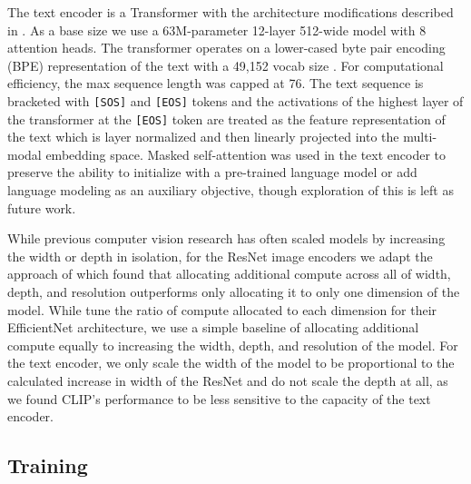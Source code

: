 The text encoder is a Transformer \citep{vaswani2017attention} with the architecture modifications described in \citet{radford2019language}. As a base size we use a 63M-parameter 12-layer 512-wide model with 8 attention heads. The transformer operates on a lower-cased byte pair encoding (BPE) representation of the text with a 49,152 vocab size \citep{sennrich2015neural}. For computational efficiency, the max sequence length was capped at 76. The text sequence is bracketed with \texttt{[SOS]} and \texttt{[EOS]} tokens and the activations of the highest layer of the transformer at the \texttt{[EOS]} token are treated as the feature representation of the text which is layer normalized and then linearly projected into the multi-modal embedding space. Masked self-attention was used in the text encoder to preserve the ability to initialize with a pre-trained language model or add language modeling as an auxiliary objective, though exploration of this is left as future work.

While previous computer vision research has often scaled models by increasing the width \citep{mahajan2018exploring} or depth \citep{he2016deep} in isolation, for the ResNet image encoders we adapt the approach of \citet{tan2019efficientnet} which found that allocating additional compute across all of width, depth, and resolution outperforms only allocating it to only one dimension of the model. While \citet{tan2019efficientnet} tune the ratio of compute allocated to each dimension for their EfficientNet architecture, we use a simple baseline of allocating additional compute equally to increasing the width, depth, and resolution of the model. For the text encoder, we only scale the width of the model to be proportional to the calculated increase in width of the ResNet and do not scale the depth at all, as we found CLIP's performance to be less sensitive to the capacity of the text encoder.

\subsection{Training}

